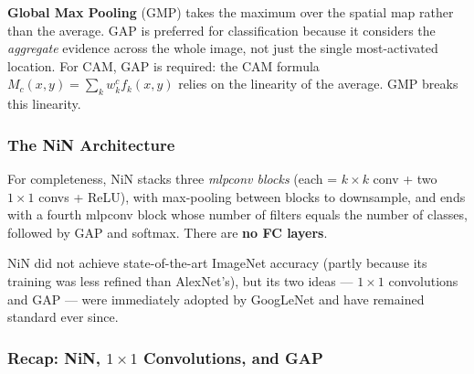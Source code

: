 \documentclass[11pt,a4paper]{article}
\begin{document}
\begin{warnbox}
\textbf{Global Max Pooling} (GMP) takes the maximum over the spatial map rather than the average.  GAP is preferred for classification because it considers the \emph{aggregate} evidence across the whole image, not just the single most-activated location.  For CAM, GAP is required: the CAM formula $M_c(x,y) = \sum_k w_k^c f_k(x,y)$ relies on the linearity of the average.  GMP breaks this linearity.
\end{warnbox}

\subsubsection{The NiN Architecture}

For completeness, NiN stacks three \emph{mlpconv blocks} (each = $k\times k$ conv + two $1\times1$ convs + ReLU), with max-pooling between blocks to downsample, and ends with a fourth mlpconv block whose number of filters equals the number of classes, followed by GAP and softmax.  There are \textbf{no FC layers}.

NiN did not achieve state-of-the-art ImageNet accuracy (partly because its training was less refined than AlexNet's), but its two ideas — $1\times1$ convolutions and GAP — were immediately adopted by GoogLeNet and have remained standard ever since.

\subsubsection{Recap: NiN, $1\times1$ Convolutions, and GAP}
\end{document}
